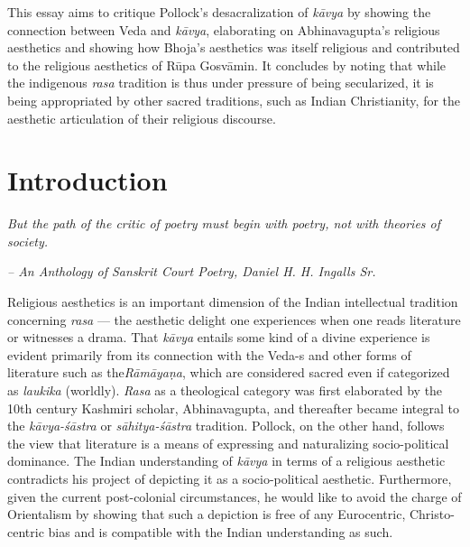 This essay aims to critique Pollock's desacralization of \textsl{kāvya} by showing the connection between Veda and \textsl{kāvya}, elaborating on Abhinavagupta's religious aesthetics and showing how Bhoja's aesthetics was itself religious and contributed to the religious aesthetics of Rūpa Gosvāmin. It concludes by noting that while the indigenous \textsl{rasa} tradition is thus under pressure of being secularized, it is being appropriated by other sacred traditions, such as Indian Christianity, for the aesthetic articulation of their religious discourse.\\[-21pt]

\section*{Introduction}

\textsl{But the path of the critic of poetry must begin with poetry, not with theories of society.}

\hfill \textsl{-- An Anthology of Sanskrit Court Poetry, Daniel H. H. Ingalls Sr.}

\smallskip

Religious aesthetics is an important dimension of the Indian intellectual tradition concerning \textsl{rasa} --- the aesthetic delight one experiences when one reads literature or witnesses a drama. That \textsl{kāvya} entails some kind of a divine experience is evident primarily from its connection with the Veda-s and other forms of literature such as the\break \textsl{Rāmāyaṇa}, which are considered sacred even if categorized as \textsl{laukika} (worldly). \textsl{Rasa} as a theological category was first elaborated by the 10th century Kashmiri scholar, Abhinavagupta, and thereafter became integral to the \textsl{kāvya-śāstra} or \textsl{sāhitya-śāstra} tradition. Pollock, on the other hand, follows the view that literature is a means of expressing and naturalizing socio-political dominance. The Indian understanding of \textsl{kāvya} in terms of a religious aesthetic contradicts his project of depicting it as a socio-political aesthetic. Furthermore, given the current post-colonial circumstances, he would like to avoid the charge of Orientalism by showing that such a depiction is free of any Eurocentric, Christo-centric bias and is compatible with the Indian understanding as such.
\eject

